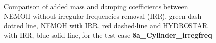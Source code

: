 \documentclass[12pt,a4paper,titlepage]{article}
\begin{document}
\begin{itemize}
\begin{figure}[h!tbp]
\centering
{}
\caption{Comparison of added mass and damping coefficients between NEMOH without irregular frequencies removal (IRR), green dash-dotted line, NEMOH with IRR, red dashed-line and HYDROSTAR with IRR, blue solid-line, for the test-case \textbf{8a\_Cylinder\_irregfreq}}\label{fig:Cylinder_IRR_addedmass_dampcoef}
\end{figure}

\begin{figure}[h!tbp]
\centering


\end{figure}
\end{itemize}
\end{document}
